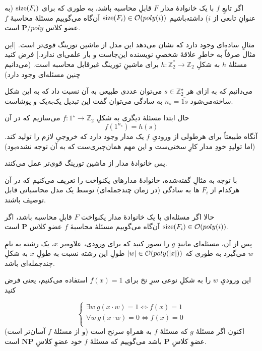 اگر تابعِ \(f\) با یک خانوادهٔ مدار \(F\) قابلِ محاسبه باشد، به طوری که برای
\(\operatorname{size}(F_i)\)
(به عنوانِ تابعی از \(i\)) داشته‌باشیم
\(\operatorname{size}(F_i) \in \mathcal{O}(poly(i))\)
آن‌گاه می‌گوییم مسئلهٔ محاسبهٔ \(f\) عضو کلاس 
\(\mathbf{P}/poly\)
است.

مثالِ ساده‌ای وجود دارد که نشان می‌دهد این مدل از ماشین تورینگ قوی‌تر است.
[این مثال صرفاً به خاطرِ علاقهٔ شخصیِ نویسنده این‌جاست و بار علمی‌ای ندارد.]
فرض کنید مسئلهٔ \(h\) به شکلِ 
\( h: \mathbb{Z}_2^* \to \mathbb{Z}_2\)
برای ماشینِ تورینگ غیرقابل محاسبه است. (می‌دانیم چنین مسئله‌ای وجود دارد)

می‌دانیم که به ازای هر 
\(s \in \mathbb{Z}_2^\star\)
می‌توان عددی طبیعی به آن نسبت داد که به این شکل ساخته‌می‌شود
\(n_s = \overline{1 s}\)
به سادگی می‌توان گفت این تبدیل یک‌به‌یک و پوشاست.

حال ابتدا مسئلهٔ دیگری به شکلِ 
\(f: 1^\star \to \mathbb{Z}_2 \)
می‌سازیم که در آن 
\begin{equation} f(1^{n_s}) = h(s) \end{equation}
آنگاه طبیعتاً برای هرطولی از ورودیِ \(f\) یک مدار وجود دارد که خروجیِ لازم را تولید کند. (اما تولیدِ خودِ مدار کارِ سختی‌ست و این مهم همان‌چیزی‌ست که به آن توجه نشده‌بود)

پس خانوادهٔ مدار از ماشین تورینگ قوی‌تر عمل می‌کنند. 

با توجه به مثالِ گفته‌شده، خانوادهٔ مدارهای یکنواخت را تعریف می‌کنیم که در آن هرکدام از
\(F_i\)
ها به سادگی (در زمان چندجمله‌ای) توسط یک مدل محاسباتی قابل توصیف باشند.

حالا اگر مسئله‌ای با یک خانوادهٔ مدار یکنواخت \(F\) قابلِ محاسبه باشد، اگر
\(\operatorname{size}(F_i) \in \mathcal{O}(poly(i))\)
آن‌گاه می‌گوییم مسئلهٔ محاسبهٔ \(f\) عضو کلاس 
\(\mathbf{P}\)
است.
 
پس از آن، مسئله‌ای مانندِ \(g\) را تصور کنید که برای ورودی، علاوه‌بر \(x\)، یک رشته به نامِ \(w\) می‌گیرد به طوری که 
\(
    |w| \in \mathcal{O}(poly(|x|))
\)
طولِ این رشته نسبت به طولِ \(x\) به شکلِ چندجمله‌ای باشد.


این ورودیِ \(w\) را به شکلِ نوعی سرِ نخ برای \(f(x)=1\) استفاده می‌کنیم، یعنی فرض کنید

\begin{equation}
    \begin{cases}
    \exists w ~ g(x \cdot w) = 1 \Leftrightarrow f(x) = 1 \\
    \forall w ~ g(x \cdot w) = 0 \Leftrightarrow f(x) = 0 \\
    \end{cases}
\end{equation} 
اکنون اگر مسئلهٔ \(g\) که مسئلهٔ \(f\) به همراهِ سرنخ است (و از مسئلهٔ \(f\) آسان‌تر است) عضوِ کلاسِ 
\( \mathbf{P} \)
باشد می‌گوییم که مسئلهٔ \(f\) خود عضوِ کلاسِ
\( \mathbf{NP} \)
است.

